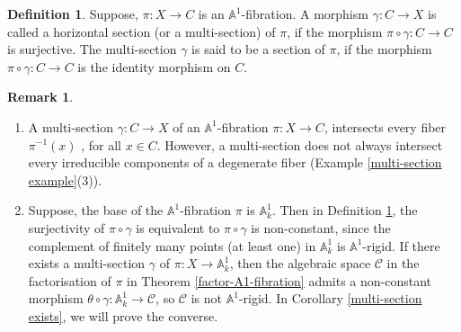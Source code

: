 \documentclass[11pt, reqno]{amsart}
\theoremstyle{plain}
\theoremstyle{definition}
\newtheorem{remark}[thm]{Remark}
\newtheorem{definition}[thm]{Definition}
\newcommand{\sC}{{\mathcal C}}
\newcommand{\A}{{\mathbb A}}
\begin{document}
		
\begin{definition} \label{multi-section definition}
Suppose, $\pi: X \to C$ is an $\mathbb{A}^1$-fibration. A morphism $\gamma: C \to X$ is called a horizontal section (or a multi-section) of $\pi$, if the morphism $\pi \circ \gamma: C \to C$ is surjective. The multi-section $\gamma$ is said to be a section of $\pi$, if the morphism $\pi \circ \gamma: C \to C$ is the identity morphism on $C$.
\end{definition}	
\begin{remark} \label{multi-section remark}
\begin{enumerate}
\item A multi-section $\gamma: C \to X$ of an $\A^1$-fibration $\pi: X \to C$, intersects every fiber $\pi^{-1}(x)$ , for all $x \in C$. However, a multi-section does not always intersect every irreducible components of a degenerate fiber (Example \ref{multi-section example}(3)).
\item Suppose, the base of the $\mathbb{A}^1$-fibration $\pi$ is $\mathbb{A}^1_k$.  Then in Definition \ref{multi-section definition}, the surjectivity of $\pi \circ \gamma$ is equivalent to $\pi \circ \gamma$ is non-constant, since the complement of finitely many points (at least one) in $\mathbb{A}^1_k$ is $\mathbb{A}^1$-rigid. If there exists a multi-section $\gamma$ of $\pi: X \to \A^1_k$, then the algebraic space $\mathcal{C}$ in the factorisation of $\pi$ in Theorem \ref{factor-A1-fibration} admits a non-constant morphism $\theta \circ \gamma: \A^1_k \to \sC$, so $\sC$ is not $\mathbb{A}^1$-rigid. In Corollary \ref{multi-section exists}, we will prove the converse.
 \end{enumerate}
\end{remark}
\end{document}
